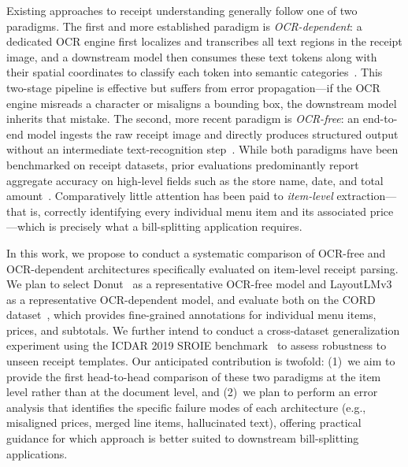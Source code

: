 \documentclass[9pt,twocolumn,twoside]{extarticle}
\begin{document}
Existing approaches to receipt understanding generally follow one of two paradigms. The first and more established paradigm is \emph{OCR-dependent}: a dedicated OCR engine first localizes and transcribes all text regions in the receipt image, and a downstream model then consumes these text tokens along with their spatial coordinates to classify each token into semantic categories~\cite{xu2020layoutlm, huang2022layoutlmv3}. This two-stage pipeline is effective but suffers from error propagation---if the OCR engine misreads a character or misaligns a bounding box, the downstream model inherits that mistake. The second, more recent paradigm is \emph{OCR-free}: an end-to-end model ingests the raw receipt image and directly produces structured output without an intermediate text-recognition step~\cite{kim2022donut}. While both paradigms have been benchmarked on receipt datasets, prior evaluations predominantly report aggregate accuracy on high-level fields such as the store name, date, and total amount~\cite{huang2019sroie, park2019cord}. Comparatively little attention has been paid to \emph{item-level} extraction---that is, correctly identifying every individual menu item and its associated price---which is precisely what a bill-splitting application requires.

In this work, we propose to conduct a systematic comparison of OCR-free and OCR-dependent architectures specifically evaluated on item-level receipt parsing. We plan to select Donut~\cite{kim2022donut} as a representative OCR-free model and LayoutLMv3~\cite{huang2022layoutlmv3} as a representative OCR-dependent model, and evaluate both on the CORD dataset~\cite{park2019cord}, which provides fine-grained annotations for individual menu items, prices, and subtotals. We further intend to conduct a cross-dataset generalization experiment using the ICDAR 2019 SROIE benchmark~\cite{huang2019sroie} to assess robustness to unseen receipt templates. Our anticipated contribution is twofold: (1)~we aim to provide the first head-to-head comparison of these two paradigms at the item level rather than at the document level, and (2)~we plan to perform an error analysis that identifies the specific failure modes of each architecture (e.g., misaligned prices, merged line items, hallucinated text), offering practical guidance for which approach is better suited to downstream bill-splitting applications.

\end{document}
